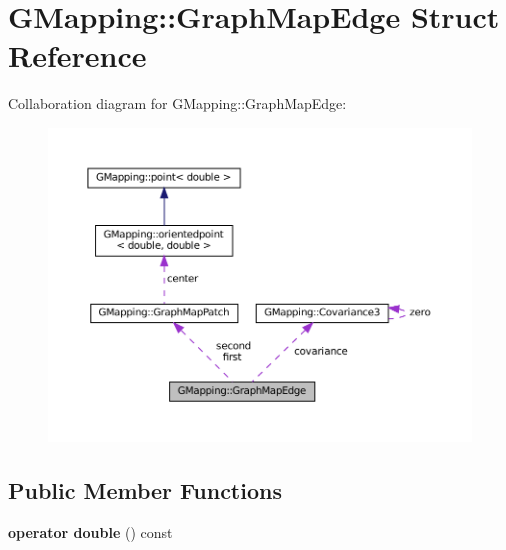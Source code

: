 \hypertarget{structGMapping_1_1GraphMapEdge}{}\section{G\+Mapping\+:\+:Graph\+Map\+Edge Struct Reference}
\label{structGMapping_1_1GraphMapEdge}


Collaboration diagram for G\+Mapping\+:\+:Graph\+Map\+Edge\+:
\nopagebreak
\begin{figure}[H]
\begin{center}
\leavevmode
\includegraphics[width=350pt]{structGMapping_1_1GraphMapEdge__coll__graph}
\end{center}
\end{figure}
\subsection*{Public Member Functions}
\begin{DoxyCompactItemize}
\item 
\mbox{\label{structGMapping_1_1GraphMapEdge_ae6488f9607d5299b99e0f3eceabb3fb3}} 
{\bfseries operator double} () const
\end{DoxyCompactItemize}

